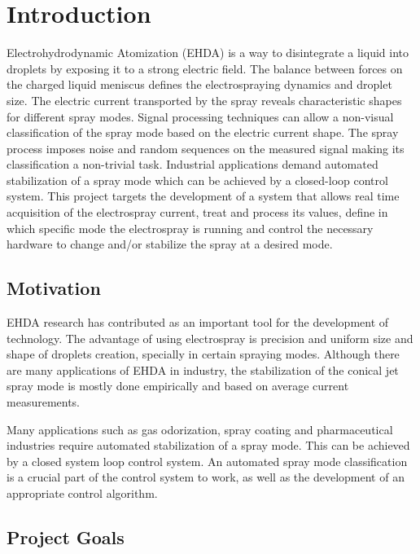 \chapter{Introduction}
\label{chap:intro} 

Electrohydrodynamic Atomization (EHDA) is a way to disintegrate a liquid into droplets by exposing it to a strong electric field.\cite{prunet}
The balance between forces on the charged liquid meniscus defines the electrospraying dynamics and droplet size.
The electric current transported by the spray reveals characteristic shapes for different spray modes.
Signal processing techniques can allow a non-visual classification of the spray mode based on the electric current shape.\cite{Sjaaks}
The spray process imposes noise and random sequences on the measured signal making its classification a non-trivial task. 
Industrial applications demand automated stabilization of a spray mode which can be achieved by a closed-loop control system. 
This project targets the development of a system that allows real time acquisition of the electrospray current, treat and process its values, define in which specific mode the electrospray is running and control the necessary hardware to change and/or stabilize the spray at a desired mode.


\section{Motivation}
\label{sec:motivation}

EHDA research has contributed as an important tool for the development of technology. 
The advantage of using electrospray is precision and uniform size and shape of droplets creation, specially in certain spraying modes. 
Although there are many applications of EHDA in industry, the stabilization of the conical jet spray mode is mostly done empirically and based on average current measurements.

Many applications such as gas odorization, spray coating and pharmaceutical industries require automated stabilization of a spray mode. 
This can be achieved by a closed system loop control system. 
An automated spray mode classification is a crucial part of the control system to work, as well as the development of an appropriate control algorithm.

\section{Project Goals}
\label{sec:goals}

